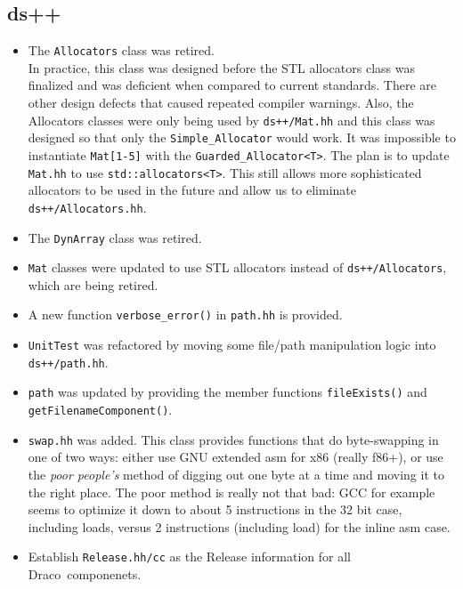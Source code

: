 \documentclass[note]{ResearchNote_pdf}
\newcommand{\draco}{Draco}
\newcommand{\scons}{\textsf{SCons}}
\begin{document}
\subsection{ds++}
\label{changes:dsxx}
\begin{itemize}
\item The \texttt{Allocators} class was retired.\\ 
     In practice, this class was designed before the STL allocators
     class was finalized and was deficient when compared to current
     standards.  There are other design defects that caused repeated
     compiler warnings. Also, the Allocators classes were only being
     used by \texttt{ds++/Mat.hh} and this class was designed so that
     only the \texttt{Simple\_Allocator} would work. It was impossible
     to instantiate \texttt{Mat[1-5]} with the
     \texttt{Guarded\_Allocator<T>}.  The plan is to update
     \texttt{Mat.hh} to use \texttt{std::allocators<T>}.  This still
     allows more sophisticated allocators to be used in the future and
     allow us to eliminate \texttt{ds++/Allocators.hh}.
\item The \texttt{DynArray} class was retired.
\item \texttt{Mat} classes were updated to use STL allocators instead
  of \texttt{ds++/Allocators}, which are being retired.
\item A new function \texttt{verbose\_error()} in \texttt{path.hh} is
  provided.
\item \texttt{UnitTest} was refactored by moving some file/path
  manipulation logic into \texttt{ds++/path.hh}.
\item \texttt{path} was updated by providing the member functions
  \texttt{fileExists()} and \texttt{getFilenameComponent()}.
\item \texttt{swap.hh} was added.  This class provides functions that
  do byte-swapping in one of two ways: either use GNU extended asm for
  x86 (really f86+), or use the \textit{poor people's} method of
  digging out one byte at a time and moving it to the right place.
  The poor method is really not that bad: GCC for example seems to
  optimize it down to about 5 instructions in the 32 bit case,
  including loads, versus 2 instructions (including load) for the
  inline asm case.
\item Establish \texttt{Release.hh/cc} as the Release information for
  all \draco\ componenets.
\end{itemize}

\end{document}
